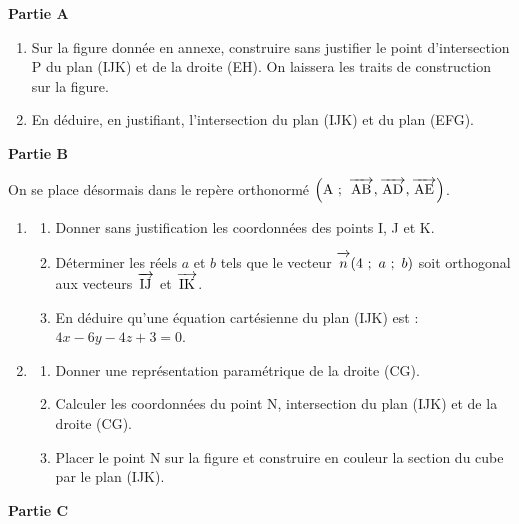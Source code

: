 \documentclass[10pt,a4paper]{article}
\newcommand{\vect}[1]{\overrightarrow{\,\mathstrut#1\,}}
\begin{document}
\bigskip

\textbf{Partie A}

\medskip

\begin{enumerate}
\item Sur la figure donnée en annexe, construire sans justifier le point d'intersection P du plan (IJK) et
de la droite (EH). On laissera les traits de construction sur la figure.
\item En déduire, en justifiant, l'intersection du plan (IJK) et du plan (EFG).
\end{enumerate}
 
\bigskip

\textbf{Partie B}

\medskip

On se place désormais dans le repère orthonormé $\left(\text{A}~;~\vect{\text{AB}}, \vect{\text{AD}}, \vect{\text{AE}}\right)$.

\medskip

\begin{enumerate}
\item 
	\begin{enumerate}
		\item Donner sans justification les coordonnées des points I, J et K.
		\item Déterminer les réels $a$ et $b$ tels que le vecteur $\vect{n} (4~;~a~;~b)$ soit orthogonal aux vecteurs $\vect{\text{IJ}}$ et $\vect{\text{IK}}$.
		\item  En déduire qu'une équation cartésienne du plan (IJK) est : $4x - 6y - 4z + 3 = 0$.
	\end{enumerate}
\item 
	\begin{enumerate}
		\item Donner une représentation paramétrique de la droite (CG).
		\item Calculer les coordonnées du point N, intersection du plan (IJK) et de la droite (CG).
		\item Placer le point N sur la figure et construire en couleur la section du cube par le plan (IJK).
	\end{enumerate}
\end{enumerate}

\bigskip

\textbf{Partie C}
\end{document}
